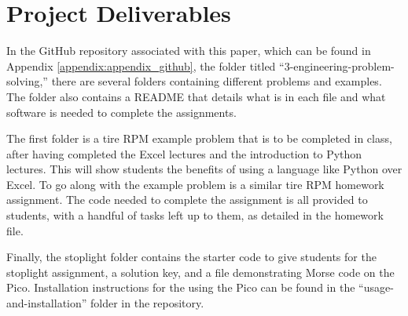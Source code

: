 \section{Project Deliverables}

In the GitHub repository associated with this paper, which can be found in Appendix \ref{appendix:appendix_github},
the folder titled ``3-engineering-problem-solving,'' there are several folders containing different problems and 
examples. The folder also contains a README that details what is in each file and what software is needed to 
complete the assignments. 

The first folder is a tire RPM example problem that is to be completed in class, after having completed the Excel
lectures and the introduction to Python lectures. This will show students the benefits of using a
language like Python over Excel. To go along with the example problem is a similar tire RPM homework assignment.
The code needed to complete the assignment is all provided to students, with a handful of tasks left up to them,
as detailed in the homework file. 

Finally, the stoplight folder contains the starter code to give students for the stoplight assignment, a solution
key, and a file demonstrating Morse code on the Pico. Installation instructions for the using the Pico can be found
in the ``usage-and-installation'' folder in the repository.
